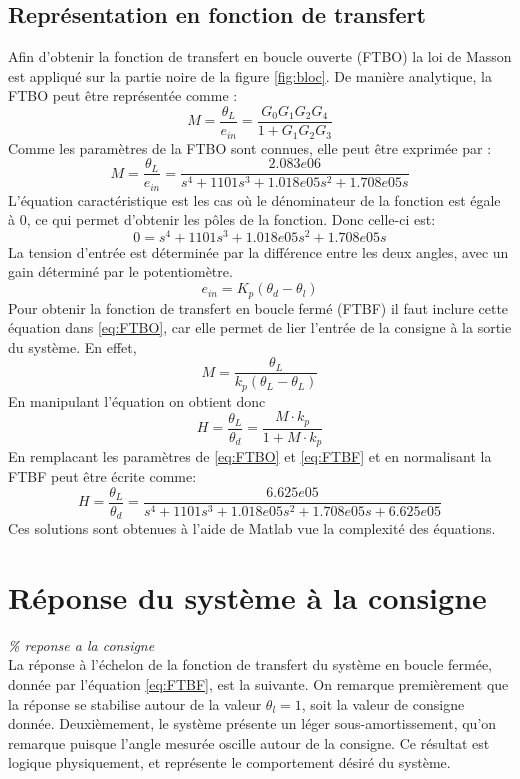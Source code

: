 \documentclass{udes_rapport} %
\begin{document}
\subsection{Représentation en fonction de transfert}
Afin d'obtenir la fonction de transfert en boucle ouverte (FTBO) la loi de Masson est appliqué sur la partie noire de la figure \ref{fig:bloc}. De manière analytique, la FTBO peut être représentée comme :
\begin{equation}
M = \frac{\theta_L}{e_{in}} = \frac{G_0 G_1 G_2 G_4}{1 + G_1 G_2 G_3}
\label{eq:FTBO}
\end{equation}
Comme les paramètres de la FTBO sont connues, elle peut être exprimée par :
\begin{equation}
M = \frac{\theta_L}{e_{in}} = \frac{2.083e06}{s^4 + 1101s^3 + 1.018e05s^2 + 1.708e05s}
\label{eq:nmum_FTBO}
\end{equation}
L'équation caractéristique est les cas où le dénominateur de la fonction est égale à 0, ce qui permet d'obtenir les pôles de la fonction. Donc celle-ci est:
\begin{equation}
0 = s^4 + 1101s^3 + 1.018e05s^2 + 1.708e05s
\label{eq:caracteristic}
\end{equation}
La tension d'entrée est déterminée par la différence entre les deux angles, avec un gain déterminé par le potentiomètre.
\[ e_{in} = K_p(\theta_d -\theta_l)\]
Pour obtenir la fonction de transfert en boucle fermé (FTBF) il faut inclure cette équation dans \eqref{eq:FTBO}, car elle permet de lier l'entrée de la consigne à la sortie du système. En effet,
\[	M = \frac{\theta_L}{k_p (\theta_L -\theta_L )}	\]
En manipulant l'équation on obtient donc
\begin{equation}
H = \frac{\theta_L}{\theta_d} = \frac{M \cdot k_p}{1+M \cdot k_p}
\label{eq:FTBF}
\end{equation}
En remplacant les paramètres de \eqref{eq:FTBO} et \eqref{eq:FTBF} et en normalisant la FTBF peut être écrite comme:
\begin{equation}
H = \frac{\theta_L}{\theta_d} = \frac{6.625e05}{s^4 + 1101s^3 + 1.018e05s^2 + 1.708e05s + 6.625e05}
\label{eq:nmum_FTBF}
\end{equation}
Ces solutions sont obtenues à l'aide de Matlab vue la complexité des équations.
\pagebreak
\section{Réponse du système à la consigne}
\textit{\% reponse a la consigne} \\
La réponse à l'échelon de la fonction de transfert du système en boucle fermée, donnée par l'équation \eqref{eq:FTBF}, est la suivante.
On remarque premièrement que la réponse se stabilise autour de la valeur $\theta_l = 1$, soit la valeur de consigne donnée.
Deuxièmement, le système présente un léger sous-amortissement, qu'on remarque puisque l'angle mesurée oscille autour de la consigne.
Ce résultat est logique physiquement, et représente le comportement désiré du système.
\end{document}
